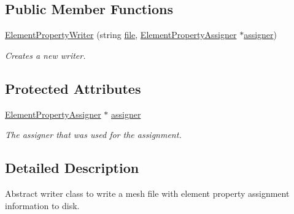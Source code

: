 \subsection*{Public Member Functions}
\begin{DoxyCompactItemize}
\item 
\hyperlink{classmesh_1_1_element_property_writer_aacedd9047813db196c47855293c56acb}{ElementPropertyWriter} (string \hyperlink{classmesh_1_1_property_writer_a296638bd6daba8a6545688bacfc4fef1}{file}, \hyperlink{classassignment_1_1_element_property_assigner}{ElementPropertyAssigner} $\ast$\hyperlink{classmesh_1_1_element_property_writer_a2b64c6f7960645dd64fa9e1e62f2ac10}{assigner})
\begin{DoxyCompactList}\small\item\em Creates a new writer. \item\end{DoxyCompactList}\end{DoxyCompactItemize}
\subsection*{Protected Attributes}
\begin{DoxyCompactItemize}
\item 
\hypertarget{classmesh_1_1_element_property_writer_a2b64c6f7960645dd64fa9e1e62f2ac10}{
\hyperlink{classassignment_1_1_element_property_assigner}{ElementPropertyAssigner} $\ast$ \hyperlink{classmesh_1_1_element_property_writer_a2b64c6f7960645dd64fa9e1e62f2ac10}{assigner}}
\label{classmesh_1_1_element_property_writer_a2b64c6f7960645dd64fa9e1e62f2ac10}

\begin{DoxyCompactList}\small\item\em The assigner that was used for the assignment. \item\end{DoxyCompactList}\end{DoxyCompactItemize}


\subsection{Detailed Description}
Abstract writer class to write a mesh file with element property assignment information to disk. 

